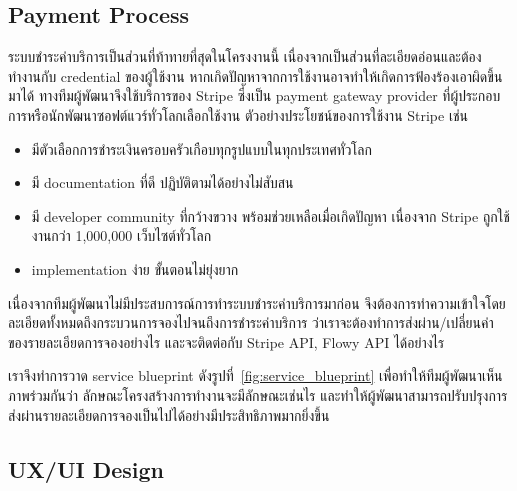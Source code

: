 \subsection{Payment Process}
ระบบชำระค่าบริการเป็นส่วนที่ท้าทายที่สุดในโครงงานนี้ เนื่องจากเป็นส่วนที่ละเอียดอ่อนและต้องทำงานกับ credential ของผู้ใช้งาน หากเกิดปัญหาจากการใช้งานอาจทำให้เกิดการฟ้องร้องเอาผิดขึ้นมาได้ ทางทีมผู้พัฒนาจึงใช้บริการของ Stripe ซึ่งเป็น payment gateway provider ที่ผู้ประกอบการหรือนักพัฒนาซอฟต์แวร์ทั่วโลกเลือกใช้งาน ตัวอย่างประโยชน์ของการใช้งาน Stripe เช่น
\begin{itemize}
    \item มีตัวเลือกการชำระเงินครอบครัวเกือบทุกรูปแบบในทุกประเทศทั่วโลก
    \item มี documentation ที่ดี ปฏิบัติตามได้อย่างไม่สับสน
    \item มี developer community ที่กว้างขวาง พร้อมช่วยเหลือเมื่อเกิดปัญหา เนื่องจาก Stripe ถูกใช้งานกว่า 1,000,000 เว็บไซต์ทั่วโลก
    \item implementation ง่าย ขั้นตอนไม่ยุ่งยาก
\end{itemize}
เนื่องจากทีมผู้พัฒนาไม่มีประสบการณ์การทำระบบชำระค่าบริการมาก่อน จึงต้องการทำความเข้าใจโดยละเอียดทั้งหมดถึงกระบวนการจองไปจนถึงการชำระค่าบริการ ว่าเราจะต้องทำการส่งผ่าน/เปลี่ยนค่าของรายละเอียดการจองอย่างไร และจะติดต่อกับ Stripe API, Flowy API ได้อย่างไร

เราจึงทำการวาด service blueprint ดังรูปที่~\ref{fig:service_blueprint} เพื่อทำให้ทีมผู้พัฒนาเห็นภาพร่วมกันว่า ลักษณะโครงสร้างการทำงานจะมีลักษณะเช่นไร และทำให้ผู้พัฒนาสามารถปรับปรุงการส่งผ่านรายละเอียดการจองเป็นไปได้อย่างมีประสิทธิภาพมากยิ่งขึ้น

\subsection{UX/UI Design}
